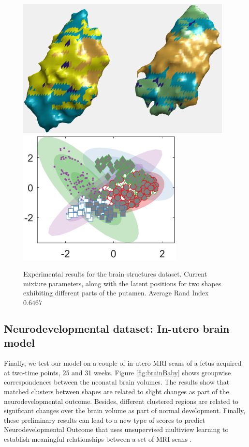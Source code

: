 \documentclass[]{article}
\begin{document}
\begin{figure}[ht!]
	\centering
	
	\includegraphics[width=0.45\linewidth]{img/putamen1MVMMexp1}
	\includegraphics[width=0.35\linewidth]{img/putamen1MVMMexp3}
	\caption{Experimental results for the brain structures dataset.  Current mixture parameters, along with the latent positions for two shapes exhibiting different parts of the putamen. Average Rand Index $0.6467$ }
	\label{fig:brainP}
\end{figure}


\subsection{Neurodevelopmental dataset: In-utero brain model}

Finally, we test our model on a couple of in-utero MRI scans of a fetus acquired at two-time points, 25 and 31 weeks. Figure \ref{fig:brainBaby} shows groupwise correspondences between the neonatal brain volumes. The results show that matched clusters between shapes are related to slight changes as part of the neurodevelopmental outcome. Besides, different clustered regions are related to significant changes over the brain volume as part of normal development. Finally, these preliminary results can lead to a new type of scores to predict Neurodevelopmental Outcome that uses unsupervised multiview learning to establish meaningful relationships between a set of MRI scans \cite{NeuroBaby18}. 
\end{document}
